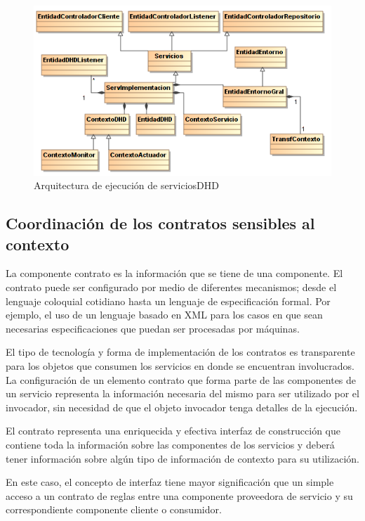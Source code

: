 {\begin{figure}
\begin{center}
\includegraphics[width=5 in,totalheight=3.2 in]{Ch4/jcaf.png}
\caption{Arquitectura de ejecución de serviciosDHD}
\label{hiperplanos}
\end{center}
\end{figure}


\subsection{Coordinación de los contratos sensibles al contexto}

La componente contrato es la información que se tiene de una componente. El contrato puede ser configurado por medio de diferentes mecanismos; desde el lenguaje coloquial cotidiano hasta un lenguaje de especificación formal. Por ejemplo, el uso de un lenguaje basado en XML para los casos en que sean necesarias especificaciones que puedan ser procesadas por máquinas.

El tipo de tecnología y forma de implementación de los contratos es transparente para los objetos que consumen los servicios en donde se encuentran involucrados. La configuración de un elemento contrato que forma parte de las componentes de un servicio representa la información necesaria del mismo para ser utilizado por el invocador, sin necesidad de que el objeto invocador tenga detalles de la ejecución.

El contrato representa una enriquecida y efectiva interfaz de construcción que contiene toda la información sobre las componentes de los servicios y deberá tener información sobre algún tipo de información de contexto para su utilización.

En este caso, el concepto de interfaz tiene mayor significación que un simple acceso a un contrato de reglas entre una  componente proveedora de servicio y su correspondiente componente cliente o consumidor.

}
